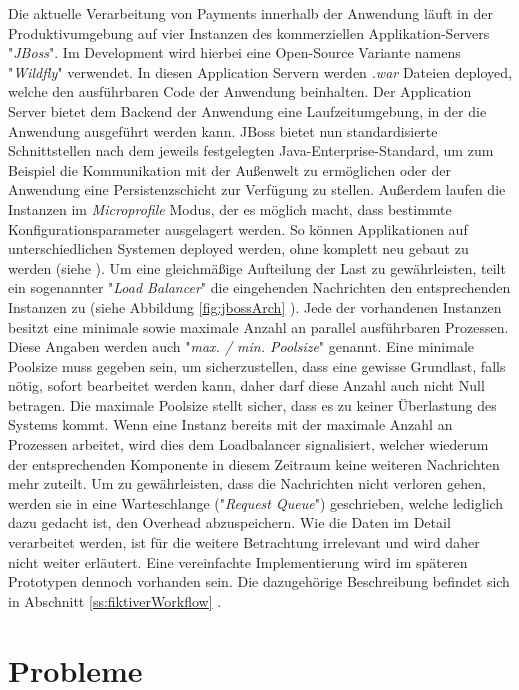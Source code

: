 \label{sec:loadbalancer}
Die aktuelle Verarbeitung von Payments innerhalb der Anwendung läuft in der Produktivumgebung auf vier Instanzen des kommerziellen Applikation-Servers "\emph{JBoss}". Im Development wird hierbei eine Open-Source Variante namens "\emph{Wildfly}" verwendet. In diesen Application Servern werden \emph{.war} Dateien deployed, welche den ausführbaren Code der Anwendung beinhalten. Der Application Server bietet dem Backend der Anwendung eine Laufzeitumgebung, in der die Anwendung ausgeführt werden kann. JBoss bietet nun standardisierte Schnittstellen nach dem jeweils festgelegten Java-Enterprise-Standard, um zum Beispiel die Kommunikation mit der Außenwelt zu ermöglichen oder der Anwendung eine Persistenzschicht zur Verfügung zu stellen. Außerdem laufen die Instanzen im \emph{Microprofile} Modus, der es möglich macht, dass bestimmte Konfigurationsparameter ausgelagert werden. So können Applikationen auf unterschiedlichen Systemen deployed werden, ohne komplett neu gebaut zu werden (siehe \cite{microprofile}). Um eine gleichmäßige Aufteilung der Last zu gewährleisten, teilt ein sogenannter "\emph{Load Balancer}" die eingehenden Nachrichten den entsprechenden Instanzen zu (siehe Abbildung \ref{fig:jbossArch} ). Jede der vorhandenen Instanzen besitzt eine minimale sowie maximale Anzahl an parallel ausführbaren Prozessen. Diese Angaben werden auch "\emph{max. / min. Poolsize}" genannt. Eine minimale Poolsize muss gegeben sein, um sicherzustellen, dass eine gewisse Grundlast, falls nötig, sofort bearbeitet werden kann, daher darf diese Anzahl auch nicht Null betragen. Die maximale Poolsize stellt sicher, dass es zu keiner Überlastung des Systems kommt. Wenn eine Instanz bereits mit der maximale Anzahl an Prozessen arbeitet, wird dies dem Loadbalancer signalisiert, welcher wiederum der entsprechenden Komponente in diesem Zeitraum keine weiteren Nachrichten mehr zuteilt. Um zu gewährleisten, dass die Nachrichten nicht verloren gehen, werden sie in eine Warteschlange ("\emph{Request Queue}") geschrieben, welche lediglich dazu gedacht ist, den Overhead abzuspeichern. Wie die Daten im Detail verarbeitet werden, ist für die weitere Betrachtung irrelevant und wird daher nicht weiter erläutert. Eine vereinfachte Implementierung wird im späteren Prototypen dennoch vorhanden sein. Die dazugehörige Beschreibung befindet sich in Abschnitt \ref{ss:fiktiverWorkflow} .


\section{Probleme}

